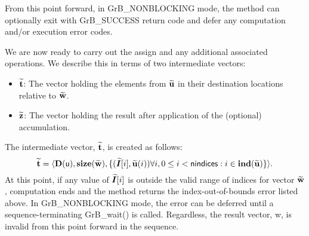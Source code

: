 From this point forward, in {\sf GrB\_NONBLOCKING} mode, the method can 
optionally exit with {\sf GrB\_SUCCESS} return code and defer any computation 
and/or execution error codes.

We are now ready to carry out the assign and any additional 
associated operations.  We describe this in terms of two intermediate vectors:
\begin{itemize}
    \item ${\bf \widetilde{t}}$: The vector holding the elements from
    ${\bf \widetilde{u}}$ in their destination locations relative to 
    ${\bf \widetilde{w}}$.
    
    \item ${\bf \widetilde{z}}$: The vector holding the result after 
    application of the (optional) accumulation.
\end{itemize}

The intermediate vector, ${\bf \widetilde{t}}$, is created as follows:
\[
{\bf \widetilde{t}} = \langle
\bold{D}({\sf u}), \bold{size}({\bf \widetilde{w}}),
\{(\bm{\widetilde{I}}[i],{\bf \widetilde{u}}(i)) \forall i, 0 \leq i < {\sf nindices} : 
i \in \bold{ind}({\bf \widetilde{u}}) \} \rangle. 
\]
At this point, if any value of $\bm{\widetilde{I}}[i]$ is outside the valid 
range of indices for vector ${\bf \widetilde{w}}$, computation ends and the 
method returns the index-out-of-bounds error listed above. In 
{\sf GrB\_NONBLOCKING} mode, the error can be deferred until a 
sequence-terminating {\sf GrB\_wait()} is called.  Regardless, the result 
vector, {\sf w}, is invalid from this point forward in the 
sequence.

